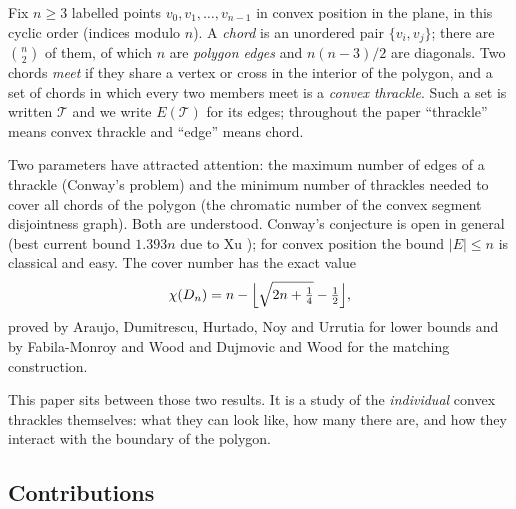 \documentclass[11pt,a4paper]{article}
\theoremstyle{definition}
\theoremstyle{plain}
\newcommand{\Thr}{\mathcal{T}}
\begin{document}
Fix $n\ge 3$ labelled points $v_0,v_1,\dots,v_{n-1}$ in convex position in the
plane, in this cyclic order (indices modulo $n$).  A \emph{chord} is an unordered
pair $\{v_i,v_j\}$; there are $\binom n2$ of them, of which $n$ are
\emph{polygon edges} and $n(n-3)/2$ are diagonals.  Two chords \emph{meet} if
they share a vertex or cross in the interior of the polygon, and a set of
chords in which every two members meet is a \emph{convex thrackle}.  Such a set
is written $\Thr$ and we write $E(\Thr)$ for its edges; throughout the paper
``thrackle'' means convex thrackle and ``edge'' means chord.

Two parameters have attracted attention: the maximum number of edges of a
thrackle (Conway's problem) and the minimum number of thrackles needed to cover
all chords of the polygon (the chromatic number of the convex segment
disjointness graph).  Both are understood.  Conway's conjecture is open in
general (best current bound $1.393n$ due to Xu \cite{Xu}); for convex position
the bound $|E|\le n$ is classical and easy.  The cover number has the exact
value
\[
\chi(D_n)=n-\Bigl\lfloor\sqrt{2n+\tfrac14}-\tfrac12\Bigr\rfloor,
\]
proved by Araujo, Dumitrescu, Hurtado, Noy and Urrutia \cite{ADHNU} for lower
bounds and by Fabila-Monroy and Wood \cite{FW} and Dujmovic and Wood \cite{DW}
for the matching construction.

This paper sits between those two results.  It is a study of the
\emph{individual} convex thrackles themselves: what they can look like, how
many there are, and how they interact with the boundary of the polygon.

\subsection{Contributions}
\end{document}
